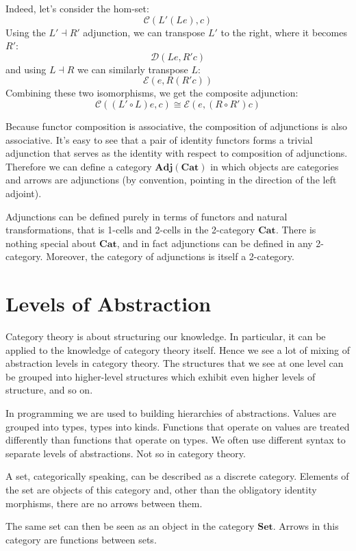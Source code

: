 \documentclass[DaoFP]{subfiles}
\begin{document}
Indeed, let's consider the hom-set:
\[ \mathcal{C}(L' (L e), c) \]
Using the $L' \dashv R'$ adjunction, we can transpose $L'$ to the right, where it becomes $R'$:
\[ \mathcal{D}(L e, R' c) \]
and using $L \dashv R$ we can similarly transpose $L$:
\[ \mathcal{E}( e, R(R' c)) \]
Combining these two isomorphisms, we get the composite adjunction:
\[ \mathcal{C}((L' \circ L) e, c) \cong \mathcal{E}( e, (R \circ R') c)\]

Because functor composition is associative, the composition of adjunctions is also associative. It's easy to see that a pair of identity functors forms a trivial adjunction that serves as the identity with respect to composition of adjunctions. Therefore we can define a category $\mathbf{Adj}(\mathbf{Cat})$ in which objects are categories and arrows are adjunctions (by convention, pointing in the direction of the left adjoint). 

Adjunctions can be defined purely in terms of functors and natural transformations, that is 1-cells and 2-cells in the 2-category $\mathbf{Cat}$. There is nothing special about $\mathbf{Cat}$, and in fact adjunctions can be defined in any 2-category. Moreover, the category of adjunctions is itself a 2-category.

\section{Levels of Abstraction}

Category theory is about structuring our knowledge. In particular, it can be applied to the knowledge of category theory itself. Hence we see a lot of mixing of abstraction levels in category theory. The structures that we see at one level can be grouped into higher-level structures which exhibit even higher levels of structure, and so on. 

In programming we are used to building hierarchies of abstractions. Values are grouped into types, types into kinds. Functions that operate on values are treated differently than functions that operate on types. We often use different syntax to separate levels of abstractions. Not so in category theory.

A set, categorically speaking, can be described as a discrete category. Elements of the set are objects of this category and, other than the obligatory identity morphisms, there are no arrows between them. 

The same set can then be seen as an object in the category $\mathbf{Set}$. Arrows in this category are functions between sets.
\end{document}
